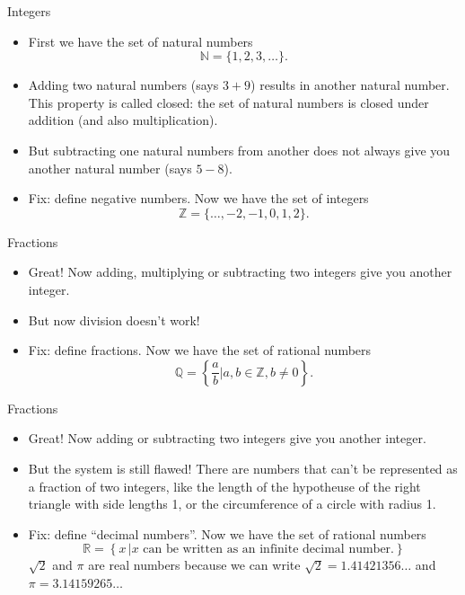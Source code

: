 \begin{frame}{Integers}
  \begin{itemize}
  \item First we have the set of natural numbers 
  \[\mathbb{N} =\{1,2,3,\ldots\}.\]
  \item Adding two natural numbers (says $3+9$) results in another natural number. This property is called closed: the set of natural numbers is closed under addition (and also multiplication).
  \item But subtracting one natural numbers from another does not always give you another natural number (says $5-8$).
  \item Fix: define negative numbers. Now we have the set of integers 
  \[\mathbb{Z} = \{\ldots, -2,-1,0,1,2\}.\]
  \end{itemize}
\end{frame}

\begin{frame}{Fractions}
  \begin{itemize}
  \item Great! Now adding, multiplying or subtracting two integers give you another integer.
  \item But now division doesn't work!
  \item Fix: define fractions. Now we have the set of rational numbers 
  \[\mathbb{Q} = \left\{\frac{a}{b} \Big| a,b \in \mathbb{Z}, b \neq 0 \right\}.\]
  \end{itemize}
\end{frame}

\begin{frame}{Fractions}
  \begin{itemize}
  \item Great! Now adding or subtracting two integers give you another integer.
  \item But the system is still flawed! There are numbers that can't be represented as a fraction of two integers, like the length of the hypotheuse of the right triangle with side lengths 1, or the circumference of a circle with radius 1.
  \begin{figure}[h!]
  \centering
  \end{figure}
  \item Fix: define ``decimal numbers''. Now we have the set of rational numbers 
\[\mathbb{R} = \left\{ x \, \Big| x \text{ can be written as an infinite decimal number.}\right\} \]
$\sqrt{2}$ and $\pi$ are real numbers because we can write $\sqrt{2} = 1.41421356\ldots$ and $\pi = 3.14159265\ldots$
  \end{itemize}
\end{frame}

